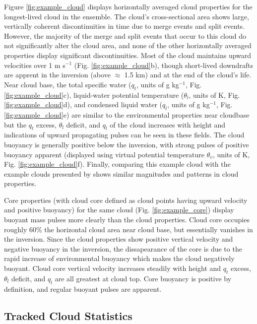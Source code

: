 \documentclass[acp]{copernicus}
\begin{document}
Figure \ref{fig:example_cloud} displays horizontally averaged cloud properties 
for the longest-lived cloud in the ensemble.  The cloud's cross-sectional area 
shows large, vertically coherent discontinuities in time due to merge events 
and split events.  However, the majority of the merge and split events that 
occur to this cloud do not significantly alter the cloud area, and none of the 
other horizontally averaged properties display significant discontinuities.  
Most of the cloud maintains upward velocities over 1 m s$^{-1}$ (Fig. 
\ref{fig:example_cloud}b), though short-lived downdrafts are apprent in the 
inversion (above $\approx$ 1.5 km) and at the end of the cloud's life.  Near 
cloud base, the total specific water ($q_t$, units of g kg$^{-1}$, Fig. 
\ref{fig:example_cloud}c), liquid-water potential temperature ($\theta_l$, 
units of K, Fig. \ref{fig:example_cloud}d), and condensed liquid water 
($q_l$, units of g kg$^{-1}$, Fig. \ref{fig:example_cloud}e) are similar to 
the environmental properties near cloudbase but the $q_t$ excess, $\theta_l$ 
deficit, and $q_l$ of the cloud increases with height and indications of 
upward propagating pulses can be seen in these fields.  The cloud buoyancy is 
generally positive below the inversion, with strong pulses of positive buoyancy 
apparent (displayed using virtual potential temperature $\theta_v$, units of 
K, Fig. \ref{fig:example_cloud}f).  Finally, comparing this example cloud with 
the example clouds presented by \citet[][figs. 4 and 5]{Heus2009} shows 
similar magnitudes and patterns in cloud properties.

Core properties (with cloud core defined as cloud points having upward velocity
and positive buoyancy) for the same cloud (Fig. \ref{fig:example_core}) 
display buoyant mass pulses more clearly than the cloud properties.  Cloud core 
occupies roughly 60\% the horizontal cloud area near cloud base, but 
essentially vanishes in the inversion.  Since the cloud properties show 
positive vertical velocity and negative buoyancy in the inversion, the 
dissapearance of the core is due to the rapid increase of environmental 
buoyancy which makes the cloud negatively buoyant.  Cloud core vertical 
velocity increases steadily with height and $q_t$ excess, $\theta_l$ deficit, 
and $q_l$ are all greatest at cloud top.  Core buoyancy is positive by 
definition, and regular buoyant pulses are apparent.

\subsection{Tracked Cloud Statistics}
\end{document}
